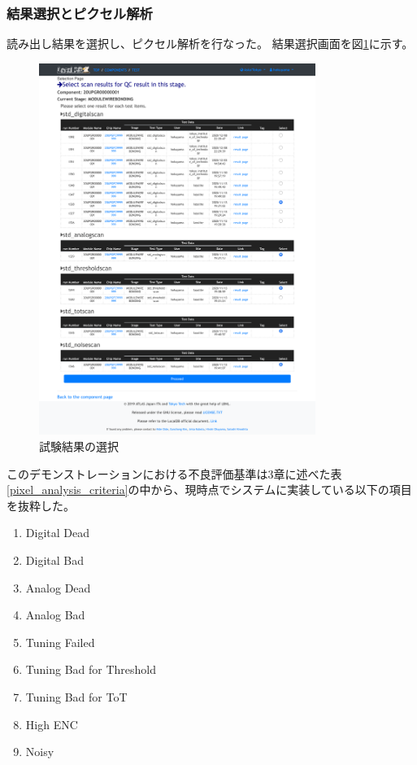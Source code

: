 \clearpage
\subsubsection{結果選択とピクセル解析}
読み出し結果を選択し、ピクセル解析を行なった。
結果選択画面を図\ref{demo_select_scans}に示す。

\begin{figure}[bpt]\centering
  \begin{center}
    \includegraphics[width=9cm]{demo_select_scans}
  \caption[試験結果の選択]{試験結果の選択}
  \label{demo_select_scans}
  \end{center}
\end{figure}

このデモンストレーションにおける不良評価基準は3章に述べた表\ref{pixel_analysis_criteria}の中から、現時点でシステムに実装している以下の項目を抜粋した。
\begin{enumerate}
  \item Digital Dead 
  \item Digital Bad 
  \item Analog Dead 
  \item Analog Bad 
  \item Tuning Failed
  \item Tuning Bad for Threshold
  \item Tuning Bad for ToT
  \item High ENC
  \item Noisy
\end{enumerate}

